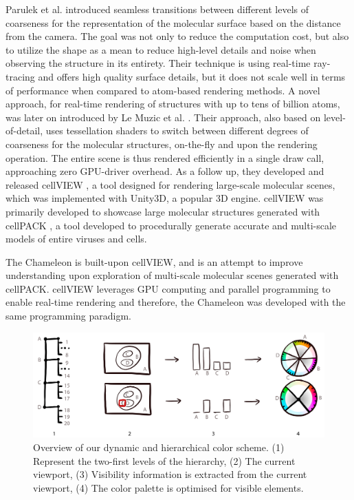 \documentclass[review,journal]{vgtc}         %
\begin{document}
Parulek et al.\cite{parulek2014continuous} introduced seamless transitions between different levels of coarseness for the representation of the molecular surface based on the distance from the camera.
The goal was not only to reduce the computation cost, but also to utilize the shape as a mean to reduce high-level details and noise when observing the structure in its entirety.
Their technique is using real-time ray-tracing and offers high quality surface details, but it does not scale well in terms of performance when compared to atom-based rendering methods.
A novel approach, for real-time rendering of structures with up to tens of billion atoms, was later on introduced by Le Muzic et al. \cite{le2014illustrative}. 
Their approach, also based on level-of-detail, uses tessellation shaders to switch between different degrees of coarseness for the molecular structures, on-the-fly and upon the rendering operation.
The entire scene is thus rendered efficiently in a single draw call, approaching zero GPU-driver overhead. 
As a follow up, they developed and released cellVIEW \cite{muzic2015cellview}, a tool designed for rendering large-scale molecular scenes, which was implemented with Unity3D, a popular 3D engine.
cellVIEW was primarily developed to showcase large molecular structures generated with cellPACK \cite{johnson2015cellpack}, a tool developed to procedurally generate accurate and multi-scale models of entire viruses and cells.

The Chameleon is built-upon cellVIEW, and is an attempt to improve understanding upon exploration of multi-scale molecular scenes generated with cellPACK.
cellVIEW leverages GPU computing and parallel programming to enable real-time rendering and therefore, the Chameleon was developed with the same programming paradigm.


\begin{figure}[t]
	\centering
	\includegraphics[width=0.85\linewidth]{Figures/coloroverview}
	\caption{Overview of our dynamic and hierarchical color scheme. (1) Represent the two-first levels of the hierarchy, (2) The current viewport, (3) Visibility information is extracted from the current viewport, (4) The color palette is optimised for visible elements.}
	\label{fig:coloroverview}
\end{figure}
\end{document}
